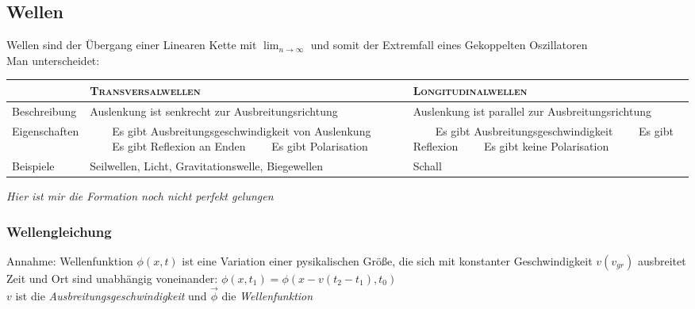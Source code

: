 \documentclass[a4paper,12pt]{report}
\newcommand{\limn}{\lim_{n \rightarrow \infty}}
\newcommand{\tabitem}{~~\llap{\textbullet}~~}
\begin{document}
\subsection{Wellen}

Wellen sind der Übergang einer Linearen Kette mit $ \limn $ und somit der Extremfall eines Gekoppelten Oszillatoren \\

Man unterscheidet: \\

\begin{tabular}{p{3cm}|p{5cm}|p{5cm}}
& \textsc{Transversalwellen} & \textsc{Longitudinalwellen} \\
\hline
Beschreibung & Auslenkung ist senkrecht zur Ausbreitungsrichtung & Auslenkung ist parallel zur Ausbreitungsrichtung \\
Eigenschaften &
\tabitem Es gibt Ausbreitungsgeschwindigkeit von Auslenkung \newline
\tabitem Es gibt Reflexion an Enden \newline
\tabitem Es gibt Polarisation \newline
& \tabitem Es gibt Ausbreitungsgeschwindigkeit \newline
\tabitem Es gibt Reflexion \newline
\tabitem Es gibt keine Polarisation \\ 

Beispiele & Seilwellen, Licht, Gravitationswelle, Biegewellen & Schall \\

\end{tabular}

\emph{Hier ist mir die Formation noch nicht perfekt gelungen} \\

\subsubsection{Wellengleichung}

Annahme: Wellenfunktion $\phi(x,t)$ ist eine Variation einer pysikalischen Größe, die sich mit konstanter Geschwindigkeit $v (v_{gr})$ ausbreitet\\

Zeit und Ort sind unabhängig voneinander: $\phi(x,t_1) = \phi(x-v(t_2-t_1),t_0) $ \\

$v$ ist die \emph{Ausbreitungsgeschwindigkeit} und $\vec{\phi} $ die \emph{Wellenfunktion} \\
\end{document}
